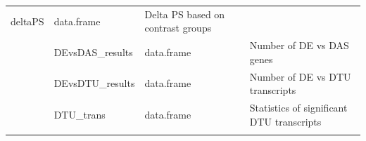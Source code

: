 \documentclass[]{article}
\begin{document}
\begin{longtable}[]{@{}llll@{}}
\begin{minipage}[t]{0.06\columnwidth}
deltaPS\strut
\end{minipage} & \begin{minipage}[t]{0.04\columnwidth}\raggedright\strut
data.frame\strut
\end{minipage} & \begin{minipage}[t]{0.71\columnwidth}\raggedright\strut
Delta PS based on contrast groups\strut
\end{minipage}\tabularnewline
\begin{minipage}[t]{0.08\columnwidth}\raggedright\strut
\strut
\end{minipage} & \begin{minipage}[t]{0.06\columnwidth}\raggedright\strut
DEvsDAS\_results\strut
\end{minipage} & \begin{minipage}[t]{0.04\columnwidth}\raggedright\strut
data.frame\strut
\end{minipage} & \begin{minipage}[t]{0.71\columnwidth}\raggedright\strut
Number of DE vs DAS genes\strut
\end{minipage}\tabularnewline
\begin{minipage}[t]{0.08\columnwidth}\raggedright\strut
\strut
\end{minipage} & \begin{minipage}[t]{0.06\columnwidth}\raggedright\strut
DEvsDTU\_results\strut
\end{minipage} & \begin{minipage}[t]{0.04\columnwidth}\raggedright\strut
data.frame\strut
\end{minipage} & \begin{minipage}[t]{0.71\columnwidth}\raggedright\strut
Number of DE vs DTU transcripts\strut
\end{minipage}\tabularnewline
\begin{minipage}[t]{0.08\columnwidth}\raggedright\strut
\strut
\end{minipage} & \begin{minipage}[t]{0.06\columnwidth}\raggedright\strut
DTU\_trans\strut
\end{minipage} & \begin{minipage}[t]{0.04\columnwidth}\raggedright\strut
data.frame\strut
\end{minipage} & \begin{minipage}[t]{0.71\columnwidth}\raggedright\strut
Statistics of significant DTU transcripts\strut
\end{minipage}\tabularnewline
\begin{minipage}[t]{0.08\columnwidth}\raggedright\strut

\end{minipage}
\end{longtable}
\end{document}
